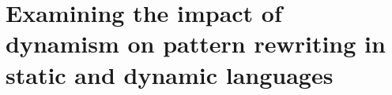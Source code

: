 



















\chapter{Examining the impact of dynamism on pattern rewriting in static and dynamic languages}
\label{chap:dynamism-pattern-rewriting}




